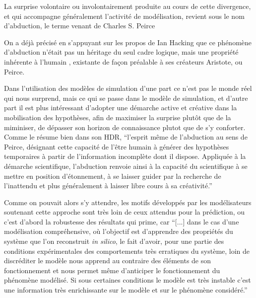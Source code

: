 La surprise volontaire ou involontairement produite au cours de cette divergence, et qui accompagne généralement l'activité de modélisation, revient sous le nom d'abduction, le terme venant de Charles S. Peirce \autocites{Besse2000, Banos2013, Phan2006, Livet2014} 

On a déjà précisé en s'appuyant sur les propos de Ian Hacking \autocites{Hacking1989,Hacking2003, Hacking2006} que ce phénomène d'abduction n'était pas un héritage du seul cadre logique, mais une propriété inhérente à l'humain , existante de façon préalable à ses créateurs Aristote, ou Peirce. 

Dans l'utilisation des modèles de simulation d'une part ce n'est pas le monde réel qui nous surprend, mais ce qui se passe dans le modèle de simulation, et d'autre part il est plus intéressant d'adopter une démarche active et créative dans la mobilisation des hypothèses, afin de maximiser la surprise plutôt que de la miminiser, de dépasser son horizon de connaissance plutot que de s'y conforter. Comme le résume bien \textcite{Banos2013} dans son HDR, \enquote{l’esprit même de l’abduction au sens de Peirce, désignant cette capacité de l’être humain à générer des hypothèses temporaires à partir de l’information incomplète dont il dispose. Appliquée à la démarche scientifique, l’abduction renvoie ainsi à la capacité du scientifique à se mettre en position d’étonnement, à se laisser guider par la recherche de l’inattendu et plus généralement à laisser libre cours à sa créativité.} 

Comme on pouvait alors s'y attendre, les motifs développés par les modélisateurs soutenant cette approche sont très loin de ceux attendus pour la prédiction, ou c'est d'abord la robustesse des résultats qui prime, car \enquote{[...] dans le cas d’une modélisation compréhensive, où l’objectif est d’apprendre des propriétés du système que l’on reconstruit \textit{in silico}, le fait d’avoir, pour une partie des conditions expérimentales des comportements très erratiques du système, loin de discréditer le modèle nous apprend au contraire des éléments de son fonctionnement et nous permet même d’anticiper le fonctionnement du phénomène modélisé. Si sous certaines conditions le modèle est très instable c’est une information très enrichissante sur le modèle et sur le phénomène considéré.} \autocite{Amblard2010} 

